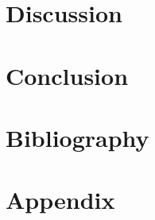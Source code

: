 \documentclass[a4paper,11pt]{article}
\begin{document}
\section{Discussion}

\section{Conclusion}



\newpage
\section{Bibliography}



\newpage
\section{Appendix}




\newpage

\end{document}
